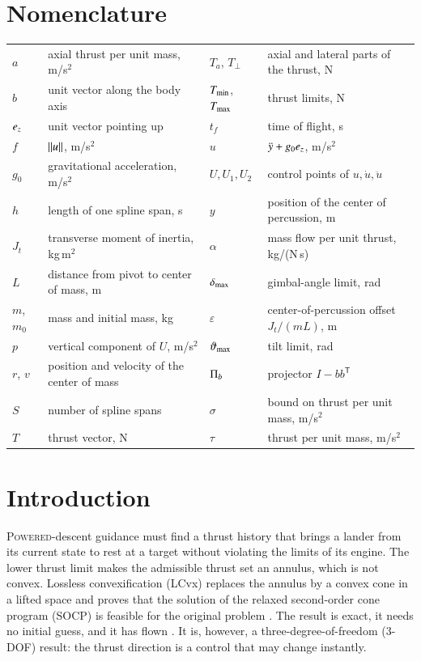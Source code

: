 \section{Nomenclature}
{\renewcommand{\arraystretch}{1.0}\noindent
\begin{tabular}{@{}l@{\ \,=\ \,}l@{\hspace{0.22in}}l@{\ \,=\ \,}l@{}}
$a$ & axial thrust per unit mass, m/s$^2$ & $T_a$, $T_\perp$ & axial and lateral parts of the thrust, N \\
$b$ & unit vector along the body axis & $T_{\min}$, $T_{\max}$ & thrust limits, N \\
$e_z$ & unit vector pointing up & $t_f$ & time of flight, s \\
$f$ & $\lVert u\rVert$, m/s$^2$ & $u$ & $\ddot y+g_0e_z$, m/s$^2$ \\
$g_0$ & gravitational acceleration, m/s$^2$ & $U,U_1,U_2$ & control points of $u,\dot u,\ddot u$ \\
$h$ & length of one spline span, s & $y$ & position of the center of percussion, m \\
$J_t$ & transverse moment of inertia, kg\,m$^2$ & $\alpha$ & mass flow per unit thrust, kg/(N\,s) \\
$L$ & distance from pivot to center of mass, m & $\delta_{\max}$ & gimbal-angle limit, rad \\
$m$, $m_0$ & mass and initial mass, kg & $\varepsilon$ & center-of-percussion offset $J_t/(mL)$, m \\
$p$ & vertical component of $U$, m/s$^2$ & $\vartheta_{\max}$ & tilt limit, rad \\
$r$, $v$ & position and velocity of the center of mass & $\Pi_b$ & projector $I-bb^{\mathsf T}$ \\
$S$ & number of spline spans & $\sigma$ & bound on thrust per unit mass, m/s$^2$ \\
$T$ & thrust vector, N & $\tau$ & thrust per unit mass, m/s$^2$ \\
\end{tabular}}

\section{Introduction}
\lettrine{P}{owered}-descent guidance must find a thrust history that brings a lander from its current state to rest at a target
without violating the limits of its engine. The lower thrust limit makes the admissible thrust set an annulus, which is not
convex. Lossless convexification (LCvx) replaces the annulus by a convex cone in a lifted space and proves that the solution of
the relaxed second-order cone program (SOCP) is feasible for the original problem \cite{acikmese2007,acikmese2011,acikmese2013}.
The result is exact, it needs no initial guess, and it has flown \cite{malyuta2022}. It is, however, a three-degree-of-freedom
(3-DOF) result: the thrust direction is a control that may change instantly.

